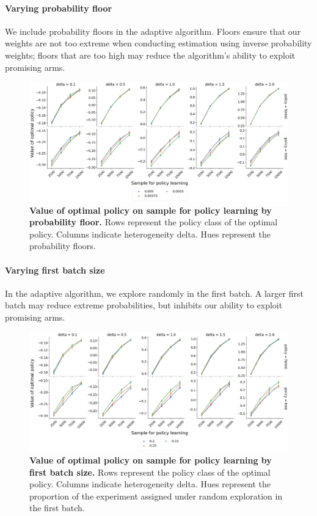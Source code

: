 \documentclass[letterpaper, 12pt, parskip=full,DIV=10]{scrartcl}
\begin{document}
\paragraph{Varying probability floor}
We include probability floors in the adaptive algorithm. %
Floors ensure that our weights are not too extreme when conducting estimation using inverse probability weights; floors that are too high may reduce the algorithm's ability to exploit promising arms.

\begin{figure}[H]
\centering
\includegraphics[width=\textwidth]{figures/value_opt_floor.png}
\caption{\textbf{Value of optimal policy on sample for policy learning by probability floor. }
Rows represent the policy class of the optimal policy.  Columns indicate heterogeneity delta.  Hues represent the probability floors. %
}
\label{fig:value_floor}
\end{figure}


\paragraph{Varying first batch size}
In the adaptive algorithm, we explore randomly in the first batch. A larger first batch may reduce extreme probabilities, but inhibits our ability to exploit promising arms. %

\begin{figure}[H]
\centering
\includegraphics[width=\textwidth]{figures/value_opt_initial_batch_prop}
\caption{\textbf{Value of optimal policy on sample for policy learning by first batch size. }
Rows represent the policy class of the optimal policy.  Columns indicate heterogeneity delta. 
Hues represent the proportion of the experiment assigned under random exploration in the first batch. }
\label{fig:value_initial_batch_prop}
\end{figure}
\end{document}

